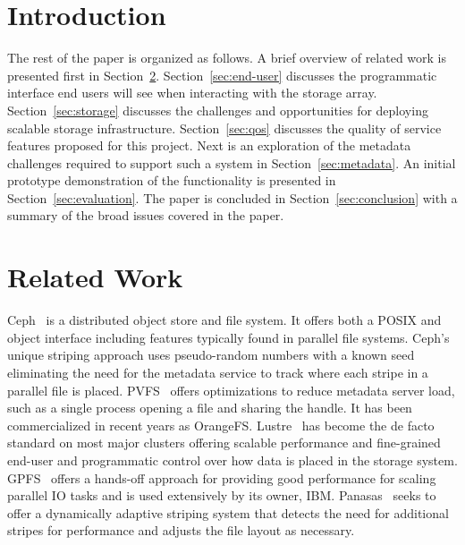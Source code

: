 \documentclass{sig-alt-gov2}
\begin{document}


\section{Introduction}


The rest of the paper is organized as follows. A brief overview of related work
is presented first in Section~\ref{sec:related}. Section~\ref{sec:end-user}
discusses the programmatic interface end users will see when interacting with
the storage array.
Section~\ref{sec:storage}
discusses the challenges and opportunities for deploying scalable storage
infrastructure.
Section~\ref{sec:qos} 
discusses the quality of service features proposed for this project.
Next is an exploration of the metadata challenges required to support such a
system in Section~\ref{sec:metadata}.
An initial prototype demonstration of the functionality is presented in
Section~\ref{sec:evaluation}.
The paper is concluded in
Section~\ref{sec:conclusion} with a summary of the broad issues covered in the
paper.

\section{Related Work}
\label{sec:related}

Ceph~\cite{weil:ceph} is a distributed object store and file system. It offers
both a POSIX and object interface including features typically found in parallel
file systems.
Ceph's unique striping approach uses pseudo-random numbers with a
known seed eliminating the need for the metadata service to track where each
stripe in a parallel file is placed.
PVFS~\cite{carns:pvfs} offers optimizations to reduce metadata server load,
such as a single process opening a file and sharing the handle.
It has been
commercialized in recent years as OrangeFS.
Lustre~\cite{braam:lustre-arch} has become the de facto standard on most major
clusters offering scalable performance and fine-grained end-user and
programmatic control over how data is placed in the storage system.
GPFS~\cite{schmuck:gpfs} offers a hands-off approach for providing good
performance for scaling parallel IO tasks and is used extensively by its owner,
IBM.
Panasas~\cite{panasas:architecture} seeks to offer a dynamically adaptive
striping system that detects the need for additional stripes for performance
and adjusts the file layout as necessary.
\end{document}
